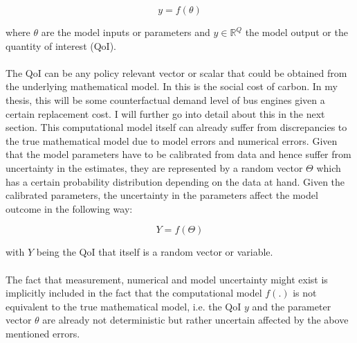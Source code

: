 \begin{equation*}
	y = f(\theta)
\end{equation*}

where $\theta$ are the model inputs or parameters and $y \in \mathbb{R}^Q$ the model output or the quantity of interest (QoI). \paragraph{}
The QoI can be any policy relevant vector or scalar that could be obtained from the underlying mathematical model. In \cite{Cai.2019} this is the social cost of carbon. In my thesis, this will be some counterfactual demand level of bus engines given a certain replacement cost. I will further go into detail about this in the next section. This computational model itself can already suffer from discrepancies to the true mathematical model due to model errors and numerical errors. Given that the model parameters have to be calibrated from data and hence suffer from uncertainty in the estimates, they are represented by a random vector $\Theta$ which has a certain probability distribution depending on the data at hand. Given the calibrated parameters, the uncertainty in the parameters affect the model outcome in the following way:

\begin{equation*}
	Y = f(\Theta)
\end{equation*}

with $Y$ being the QoI that itself is a random vector or variable. \paragraph{}

The fact that measurement, numerical and model uncertainty might exist is implicitly included in the fact that the computational model $f(.)$ is not equivalent to the true mathematical model, i.e. the QoI $y$ and the parameter vector $\theta$ are already not deterministic but rather uncertain affected by the above mentioned errors.

